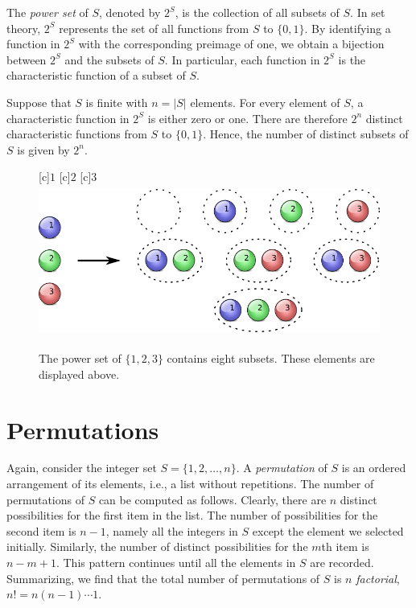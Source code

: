 \begin{example}
The \emph{power set} of $S$, denoted by $2^S$, is the collection of all subsets of $S$. 
In set theory, $2^S$ represents the set of all functions from $S$ to $\{ 0, 1\}$.
By identifying a function in $2^S$ with the corresponding preimage of one, we obtain a bijection between $2^S$ and the subsets of $S$.
In particular, each function in $2^S$ is the characteristic function of a subset of $S$.

Suppose that $S$ is finite with $n = |S|$ elements.
For every element of $S$, a characteristic function in $2^S$ is either zero or one.
There are therefore $2^n$ distinct characteristic functions from $S$ to $\{ 0, 1\}$.
Hence, the number of distinct subsets of $S$ is given by $2^n$.

\begin{figure}[htb!]
\begin{center}
\begin{psfrags}
[c]{$1$}
[c]{$2$}
[c]{$3$}
\includegraphics[height=4.965cm]{Figures/4Chapter/powerset}
\end{psfrags}
\caption{The power set of $\{ 1, 2, 3 \}$ contains eight subsets.
These elements are displayed above.}
\label{figure:PowerSet}
\end{center}
\end{figure}
\end{example}


\section{Permutations}

Again, consider the integer set $S = \{ 1, 2, \ldots, n \}$.
A \emph{permutation} of $S$ is an ordered arrangement of its elements, i.e., a list without repetitions. 
The number of permutations of $S$ can be computed as follows.
Clearly, there are $n$ distinct possibilities for the first item in the list.
The number of possibilities for the second item is $n-1$, namely all the integers in $S$ except the element we selected initially.
Similarly, the number of distinct possibilities for the $m$th item is $n - m + 1$.
This pattern continues until all the elements in $S$ are recorded.
Summarizing, we find that the total number of permutations of $S$ is $n$ \emph{factorial}, $n! = n (n-1) \cdots 1$. 

